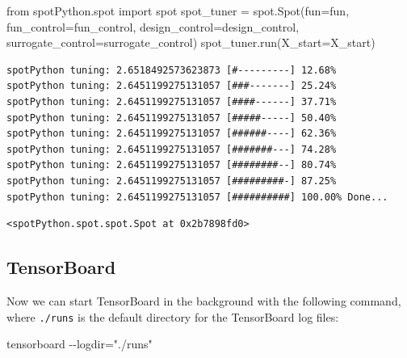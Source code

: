 \documentclass[
  letterpaper,
  DIV=11,
  numbers=noendperiod]{scrreprt}
\newenvironment{Shaded}{\begin{snugshade}}{\end{snugshade}}
\newcommand{\ImportTok}[1]{\textcolor[rgb]{0.00,0.46,0.62}{#1}}
\newcommand{\NormalTok}[1]{\textcolor[rgb]{0.00,0.23,0.31}{#1}}
\newcommand{\OperatorTok}[1]{\textcolor[rgb]{0.37,0.37,0.37}{#1}}
\begin{document}
\begin{Shaded}
\begin{Highlighting}[]
\ImportTok{from}\NormalTok{ spotPython.spot }\ImportTok{import}\NormalTok{ spot}
\NormalTok{spot\_tuner }\OperatorTok{=}\NormalTok{ spot.Spot(fun}\OperatorTok{=}\NormalTok{fun,}
\NormalTok{                   fun\_control}\OperatorTok{=}\NormalTok{fun\_control,}
\NormalTok{                   design\_control}\OperatorTok{=}\NormalTok{design\_control,}
\NormalTok{                   surrogate\_control}\OperatorTok{=}\NormalTok{surrogate\_control)}
\NormalTok{spot\_tuner.run(X\_start}\OperatorTok{=}\NormalTok{X\_start)}
\end{Highlighting}
\end{Shaded}

\begin{verbatim}
spotPython tuning: 2.6518492573623873 [#---------] 12.68% 
spotPython tuning: 2.6451199275131057 [###-------] 25.24% 
spotPython tuning: 2.6451199275131057 [####------] 37.71% 
spotPython tuning: 2.6451199275131057 [#####-----] 50.40% 
spotPython tuning: 2.6451199275131057 [######----] 62.36% 
spotPython tuning: 2.6451199275131057 [#######---] 74.28% 
spotPython tuning: 2.6451199275131057 [########--] 80.74% 
spotPython tuning: 2.6451199275131057 [#########-] 87.25% 
spotPython tuning: 2.6451199275131057 [##########] 100.00% Done...
\end{verbatim}

\begin{verbatim}
<spotPython.spot.spot.Spot at 0x2b7898fd0>
\end{verbatim}

\subsection{TensorBoard}\label{sec-tensorboard-10}

Now we can start TensorBoard in the background with the following
command, where \texttt{./runs} is the default directory for the
TensorBoard log files:

\begin{Shaded}
\begin{Highlighting}[]
\NormalTok{tensorboard {-}{-}logdir="./runs"}
\end{Highlighting}
\end{Shaded}
\end{document}
